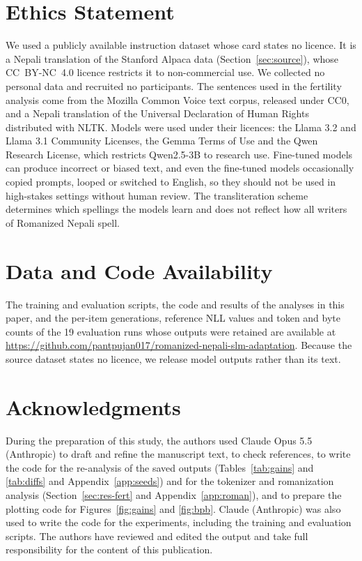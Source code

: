 \documentclass{article}
\begin{document}
\section*{Ethics Statement}\label{sec:ethics}

We used a publicly available instruction dataset whose card states no licence. It is a Nepali translation of the Stanford Alpaca data (Section~\ref{sec:source}), whose CC~BY-NC~4.0 licence restricts it to non-commercial use. We collected no personal data and recruited no participants. The sentences used in the fertility analysis come from the Mozilla Common Voice text corpus, released under CC0, and a Nepali translation of the Universal Declaration of Human Rights distributed with NLTK. Models were used under their licences: the Llama 3.2 and Llama 3.1 Community Licenses, the Gemma Terms of Use and the Qwen Research License, which restricts Qwen2.5-3B to research use. Fine-tuned models can produce incorrect or biased text, and even the fine-tuned models occasionally copied prompts, looped or switched to English, so they should not be used in high-stakes settings without human review. The transliteration scheme determines which spellings the models learn and does not reflect how all writers of Romanized Nepali spell.

\section*{Data and Code Availability}\label{sec:availability}

The training and evaluation scripts, the code and results of the analyses in this paper, and the per-item generations, reference NLL values and token and byte counts of the 19 evaluation runs whose outputs were retained are available at \url{https://github.com/pantpujan017/romanized-nepali-slm-adaptation}. Because the source dataset states no licence, we release model outputs rather than its text.

\section*{Acknowledgments}\label{sec:ack}

During the preparation of this study, the authors used Claude Opus 5.5 (Anthropic) to draft and refine the manuscript text, to check references, to write the code for the re-analysis of the saved outputs (Tables~\ref{tab:gains} and \ref{tab:diffs} and Appendix~\ref{app:seeds}) and for the tokenizer and romanization analysis (Section~\ref{sec:res-fert} and Appendix~\ref{app:roman}), and to prepare the plotting code for Figures~\ref{fig:gains} and \ref{fig:bpb}. Claude (Anthropic) was also used to write the code for the experiments, including the training and evaluation scripts. The authors have reviewed and edited the output and take full responsibility for the content of this publication.
\end{document}
